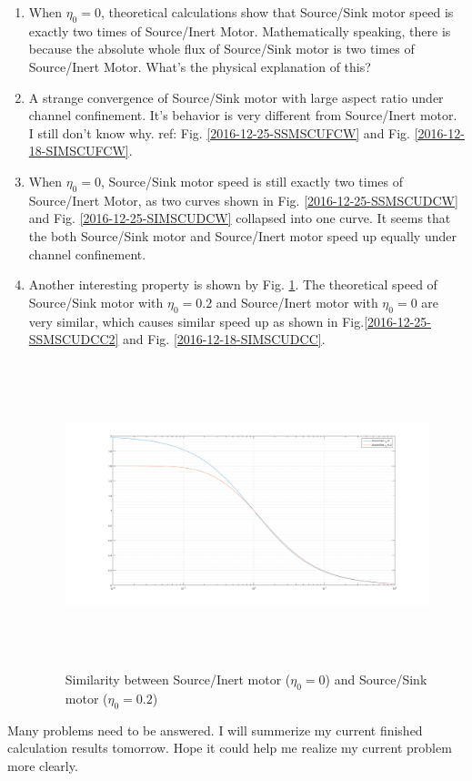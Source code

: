 \documentclass[fontsize=11pt, %
                             paper=a4, %
                             twoside, %
                             captions=tableheading,
                             index=totoc,
                             hyperref]{labbook}
\begin{document}
\begin{enumerate}
\item
When $\eta_0=0$, theoretical calculations show that Source/Sink motor speed is exactly two times of Source/Inert Motor. Mathematically speaking, there is because the absolute whole flux of Source/Sink motor is two times of Source/Inert Motor. What's the physical explanation of this?
\item
A strange convergence of Source/Sink motor with large aspect ratio under channel confinement. It's behavior is very different from Source/Inert motor. I still don't know why. ref: Fig. \ref{2016-12-25-SSMSCUFCW} and Fig. \ref{2016-12-18-SIMSCUFCW}.
\item
When $\eta_0=0$, Source/Sink motor speed is still exactly two times of Source/Inert Motor, as two curves shown in Fig. \ref{2016-12-25-SSMSCUDCW} and Fig. \ref{2016-12-25-SIMSCUDCW} collapsed into one curve. It seems that the both Source/Sink motor and Source/Inert motor speed up equally under channel confinement.
\item Another interesting property is shown by Fig. \ref{2016-12-25-SBSISS}. The theoretical speed of Source/Sink motor with $\eta_0=0.2$ and Source/Inert motor with $\eta_0=0$ are very similar, which causes similar speed up as shown in Fig.\ref{2016-12-25-SSMSCUDCC2} and Fig. \ref{2016-12-18-SIMSCUDCC}.
\begin{figure}
\centering
\includegraphics[width=\linewidth, height=3.5in]{2016-12-25-similar.png}
\caption{Similarity between Source/Inert motor ($\eta_0=0$) and Source/Sink motor ($\eta_0=0.2$)}\label{2016-12-25-SBSISS}
\end{figure}
\end{enumerate}
Many problems need to be answered. I will summerize my current finished calculation results tomorrow. Hope it could help me realize my current problem more clearly.
\end{document}
